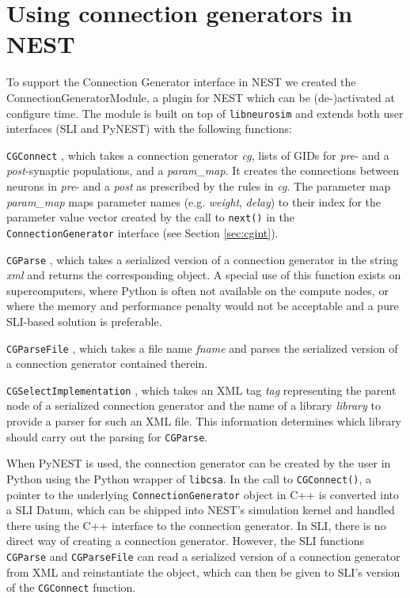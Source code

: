 \documentclass{frontiersSCNS} %
\begin{document}
\section{Using connection generators in NEST}\label{sec:conn_gen_nest}

To support the Connection Generator interface in NEST we created the
ConnectionGeneratorModule, a plugin for NEST which can be
(de-)activated at configure time. The module is built on top of
\verb|libneurosim| and extends both user interfaces (SLI and PyNEST)
with the following functions:

\begin{unlist}
\item[\tt CGConnect], which takes a connection generator \emph{cg},
  lists of GIDs for \emph{pre}- and a \emph{post}-synaptic
  populations, and a \emph{param\_map}. It creates the connections
  between neurons in \emph{pre}- and a \emph{post} as prescribed by
  the rules in \emph{cg}. The parameter map \emph{param\_map} maps
  parameter names (e.g. \emph{weight}, \emph{delay}) to their index
  for the parameter value vector created by the call to \verb|next()|
  in the \verb|ConnectionGenerator| interface (see Section
  \ref{sec:cgint}).
\item[\tt CGParse], which takes a serialized version of a connection
  generator in the string \emph{xml} and returns the corresponding
  object. A special use of this function exists on supercomputers,
  where Python is often not available on the compute nodes, or where
  the memory and performance penalty would not be acceptable and a
  pure SLI-based solution is preferable.
\item[\tt CGParseFile], which takes a file name \emph{fname} and parses
  the serialized version of a connection generator contained therein.
\item[\tt CGSelectImplementation], which takes an XML tag \emph{tag}
  representing the parent node of a serialized connection generator
  and the name of a library \emph{library} to provide a parser for
  such an XML file. This information determines which library should
  carry out the parsing for \verb|CGParse|.
\end{unlist}

When PyNEST is used, the connection generator can be created by the
user in Python using the Python wrapper of \verb|libcsa|. In the call
to \verb|CGConnect()|, a pointer to the underlying
\verb|ConnectionGenerator| object in C++ is converted into a SLI
Datum, which can be shipped into NEST's simulation kernel and handled
there using the C++ interface to the connection generator. In SLI,
there is no direct way of creating a connection generator. However,
the SLI functions \verb|CGParse| and \verb|CGParseFile| can read a
serialized version of a connection generator from XML and
reinstantiate the object, which can then be given to SLI's version of
the \verb|CGConnect| function.
\end{document}
